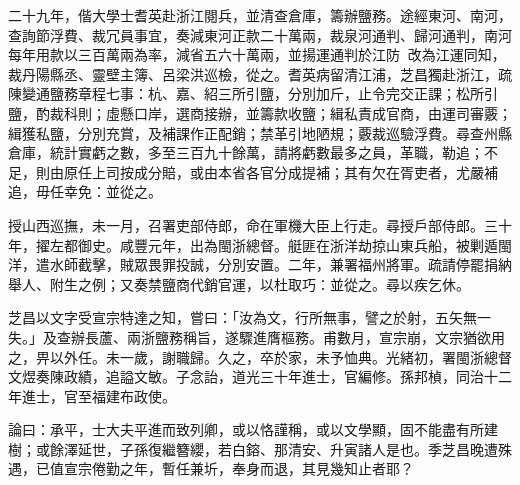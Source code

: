 \begin{pinyinscope}
二十九年，偕大學士耆英赴浙江閱兵，並清查倉庫，籌辦鹽務。途經東河、南河，查詢節浮費、裁冗員事宜，奏減東河正款二十萬兩，裁泉河通判、歸河通判，南河每年用款以三百萬兩為率，減省五六十萬兩，並揚運通判於江防，改為江運同知，裁丹陽縣丞、靈壁主簿、呂梁洪巡檢，從之。耆英病留清江浦，芝昌獨赴浙江，疏陳變通鹽務章程七事：杭、嘉、紹三所引鹽，分別加斤，止令完交正課；松所引鹽，酌裁科則；虛懸口岸，選商接辦，並籌款收鹽；緝私責成官商，由運司審覈；緝獲私鹽，分別充賞，及補課作正配銷；禁革引地陋規；覈裁巡驗浮費。尋查州縣倉庫，統計實虧之數，多至三百九十餘萬，請將虧數最多之員，革職，勒追；不足，則由原任上司按成分賠，或由本省各官分成提補；其有欠在胥吏者，尤嚴補追，毋任幸免：並從之。

授山西巡撫，未一月，召署吏部侍郎，命在軍機大臣上行走。尋授戶部侍郎。三十年，擢左都御史。咸豐元年，出為閩浙總督。艇匪在浙洋劫掠山東兵船，被剿遁閩洋，遣水師截擊，賊眾畏罪投誠，分別安置。二年，兼署福州將軍。疏請停罷捐納舉人、附生之例；又奏禁鹽商代銷官運，以杜取巧：並從之。尋以疾乞休。

芝昌以文字受宣宗特達之知，嘗曰：「汝為文，行所無事，譬之於射，五矢無一失。」及查辦長蘆、兩浙鹽務稱旨，遂驟進膺樞務。甫數月，宣宗崩，文宗猶欲用之，畀以外任。未一歲，謝職歸。久之，卒於家，未予恤典。光緒初，署閩浙總督文煜奏陳政績，追謚文敏。子念詒，道光三十年進士，官編修。孫邦楨，同治十二年進士，官至福建布政使。

論曰：承平，士大夫平進而致列卿，或以恪謹稱，或以文學顯，固不能盡有所建樹；或餘澤延世，子孫復繼簪纓，若白鎔、那清安、升寅諸人是也。季芝昌晚遭殊遇，已值宣宗倦勤之年，暫任兼圻，奉身而退，其見幾知止者耶？


\end{pinyinscope}